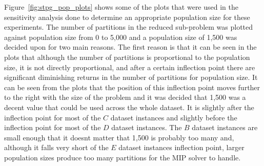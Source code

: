 \documentclass[authoryear,11pt,square,number,times,super,comma]{elsarticle}
\begin{document}
Figure~\ref{fig:stpg_pop_plots} shows some of the plots that were used in the sensitivity analysis done to determine an appropriate population size for these experiments. The number of partitions in the reduced sub-problem was plotted against population size from 0 to 5,000 and a population size of 1,500 was decided upon for two main reasons. The first reason is that it can be seen in the plots that although the number of partitions is proportional to the population size, it is not directly proportional, and after a certain inflection point there are significant diminishing returns in the number of partitions for population size. It can be seen from the plots that the position of this inflection point moves further to the right with the size of the problem and it was decided that 1,500 was a decent value that could be used across the whole dataset. It is slightly after the inflection point for most of the \(C\) dataset instances and slightly before the inflection point for most of the \(D\) dataset instances. The \(B\) dataset instances are small enough that it doesnt matter that 1,500 is probably too many and, although it falls very short of the \(E\) dataset instances inflection point, larger population sizes produce too many partitions for the MIP solver to handle.
\end{document}
